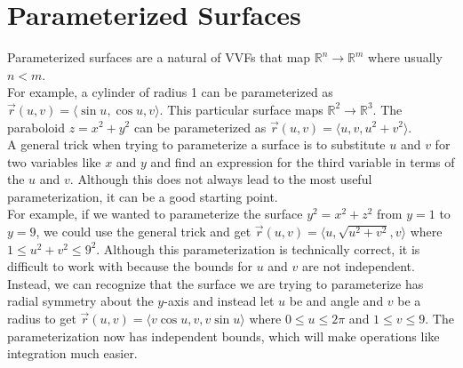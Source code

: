\section{Parameterized Surfaces}
\noindent
Parameterized surfaces are a natural of VVFs that map $\mathbb{R}^n \to \mathbb{R}^m$ where usually $n<m$.\\

\noindent
For example, a cylinder of radius 1 can be parameterized as $\vec{r}(u,v) = \langle\sin{u}, \cos{u}, v\rangle$.
This particular surface maps $\mathbb{R}^2 \to \mathbb{R}^3$.
The paraboloid $z = x^2 + y^2$ can be parameterized as $\vec{r}(u,v)=\langle u, v, u^2+v^2 \rangle$.\\

\noindent
A general trick when trying to parameterize a surface is to substitute $u$ and $v$ for two variables like $x$ and $y$ and find an expression for the third variable in terms of the $u$ and $v$.
Although this does not always lead to the most useful parameterization, it can be a good starting point.\\

\noindent
For example, if we wanted to parameterize the surface $y^2=x^2+z^2$ from $y=1$ to $y=9$, we could use the general trick and get $\vec{r}(u,v) = \langle u,\sqrt{u^2+v^2},v\rangle$ where $1\leq u^2+v^2\leq 9^2$.
Although this parameterization is technically correct, it is difficult to work with because the bounds for $u$ and $v$ are not independent.\\
Instead, we can recognize that the surface we are trying to parameterize has radial symmetry about the $y$-axis and instead let $u$ be and angle and $v$ be a radius to get $\vec{r}(u,v) = \langle v\cos{u}, v, v\sin{u}\rangle$ where $0\leq u\leq 2\pi$ and $1\leq v\leq 9$.
The parameterization now has independent bounds, which will make operations like integration much easier.
